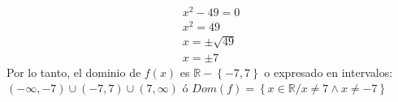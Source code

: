 \documentclass[12pt]{article}
\begin{document}
\begin{enumerate}
\begin{enumerate}
                \begin{gather*}
                    x^2-49=0\\
                    x^2=49\\
                    x=\pm \sqrt{49}\\
                    x=\pm 7
                \end{gather*}
                Por lo tanto, el dominio de $f(x)$ es $\mathbb{R}-\left\{-7,7\right\}$ o expresado en intervalos: $(-\infty,-7)\cup(-7,7)\cup(7,\infty)$ ó $Dom(f)=\left\{x \in \mathbb{R}/ x \neq7 \wedge x \neq -7 \right\}$
            \end{enumerate}
\end{enumerate}
\end{document}
